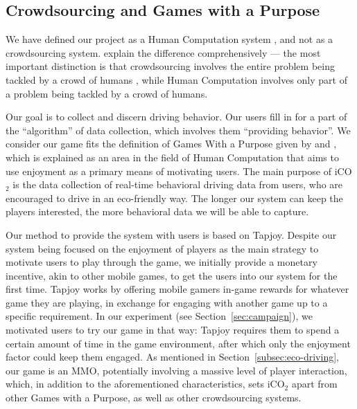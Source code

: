 \documentclass[preprint,authoryear,12pt]{elsarticle}
\begin{document}
\subsection{Crowdsourcing and Games with a Purpose}
\label{subsec:csandgwap}

We have defined our project as a Human Computation system \citep{Yuen.2009,Krause+Smeddinck.2011}, and not as a crowdsourcing system. \cite{Quinn} explain the difference comprehensively --- the most important distinction is that crowdsourcing involves the entire problem being tackled by a crowd of humans \citep{howe2008crowdsourcing}, while Human Computation involves only part of a problem being tackled by a crowd of humans.

Our goal is to collect and discern driving behavior. Our users fill in for a part of the ``algorithm'' of data collection, which involves them ``providing behavior''.
We consider our game fits the definition of Games With a Purpose given by \cite{Quinn} and \cite{vonAhn2006Games}, which is explained as an area in the field of Human Computation that aims to use enjoyment as a primary means of motivating users. The main purpose of iCO$_2$ is the data collection of real-time behavioral driving data from users, who are encouraged to drive in an eco-friendly way. The longer our system can keep the players interested, the more behavioral data we will be able to capture.



Our method to provide the system with users is based on Tapjoy. Despite our system being focused on the enjoyment of players as the main strategy to motivate users to play through the game, we initially provide a monetary incentive, akin to other mobile games, to get the users into our system for the first time. Tapjoy works by offering mobile gamers in-game rewards for whatever game they are playing, in exchange for engaging with another game up to a specific requirement. In our experiment (see Section~\ref{sec:campaign}), we motivated users to try our game in that way: Tapjoy requires them to spend a certain amount of time in the game environment, after which only the enjoyment factor could keep them engaged.
As mentioned in Section~\ref{subsec:eco-driving}, our game is an MMO, potentially involving a massive level of player interaction, which, in addition to the aforementioned characteristics, sets iCO$_2$ apart from other Games with a Purpose, as well as other crowdsourcing systems.
\end{document}
